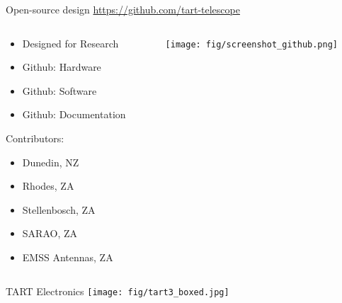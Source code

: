 \documentclass[ignorenonframetext]{beamer}
\begin{document}
% 

\begin{frame}{Open-source design}
  \centering\url{https://github.com/tart-telescope}
 \begin{columns}
  \begin{column}{0.4\linewidth}
    \begin{itemize}
      \item Designed for Research
      \item Github: Hardware
      \item Github: Software
      \item Github: Documentation
    \end{itemize}
    
    Contributors:
    \begin{itemize}
      \item Dunedin, NZ
      \item Rhodes, ZA
      \item Stellenbosch, ZA
      \item SARAO, ZA
      \item EMSS Antennas, ZA
    \end{itemize}
  \end{column}
  \begin{column}{0.6\linewidth}
    \texttt{[image: fig/screenshot\_github.png]}
  \end{column}
  \end{columns}
\end{frame}

 


\begin{frame}{TART Electronics}
 \texttt{[image: fig/tart3\_boxed.jpg]}
\end{frame}
\end{document}
